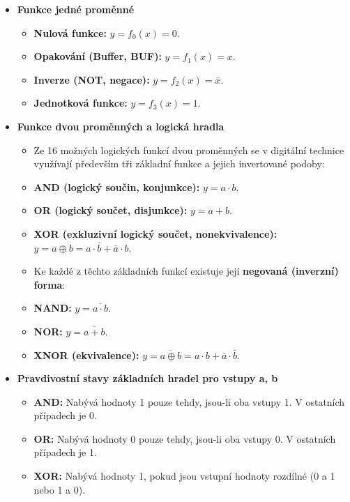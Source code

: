         \begin{itemize}
            \item \textbf{Funkce jedné proměnné}
            \begin{itemize}
                \item \textbf{Nulová funkce:} $y = f_0(x) = 0$.
                \item \textbf{Opakování (Buffer, BUF):} $y = f_1(x) = x$.
                \item \textbf{Inverze (NOT, negace):} $y = f_2(x) = \bar{x}$.
                \item \textbf{Jednotková funkce:} $y = f_3(x) = 1$.
            \end{itemize}
        
            \item \textbf{Funkce dvou proměnných a logická hradla}
            \begin{itemize}
                \item Ze 16 možných logických funkcí dvou proměnných se v digitální technice využívají především tři základní funkce a jejich invertované podoby:
                \item \textbf{AND (logický součin, konjunkce):} $y = a \cdot b$.
                \item \textbf{OR (logický součet, disjunkce):} $y = a + b$.
                \item \textbf{XOR (exkluzivní logický součet, nonekvivalence):} $y = a \oplus b = a \cdot \bar{b} + \bar{a} \cdot b$.
                \item Ke každé z těchto základních funkcí existuje její \textbf{negovaná (inverzní) forma}:
                \item \textbf{NAND:} $y = \overline{a \cdot b}$.
                \item \textbf{NOR:} $y = \overline{a + b}$.
                \item \textbf{XNOR (ekvivalence):} $y = \overline{a \oplus b} = a \cdot b + \bar{a} \cdot \bar{b}$.
            \end{itemize}
        
            \item \textbf{Pravdivostní stavy základních hradel pro vstupy a, b}
            \begin{itemize}
                \item \textbf{AND:} Nabývá hodnoty 1 pouze tehdy, jsou-li oba vstupy 1. V ostatních případech je 0.
                \item \textbf{OR:} Nabývá hodnoty 0 pouze tehdy, jsou-li oba vstupy 0. V ostatních případech je 1.
                \item \textbf{XOR:} Nabývá hodnoty 1, pokud jsou vstupní hodnoty rozdílné (0 a 1 nebo 1 a 0).
            \end{itemize}
        \end{itemize}
